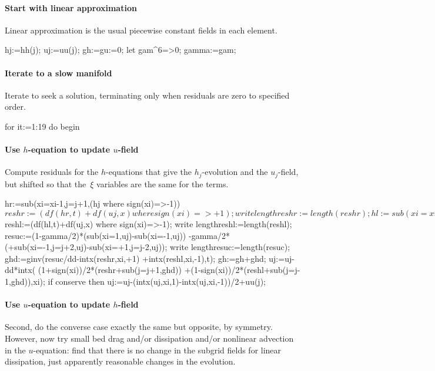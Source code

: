 \documentclass[10pt,a5paper]{article}
\begin{document}
\paragraph{Start with linear approximation}
Linear approximation is the usual piecewise constant fields in each element.
\begin{reduce}
hj:=hh(j); uj:=uu(j);
gh:=gu:=0;
let gam^6=>0;
gamma:=gam;
\end{reduce}

\paragraph{Iterate to a slow manifold}
Iterate to seek a solution, terminating only when residuals are zero to specified order.
\begin{reduce}
for it:=1:19 do begin
\end{reduce}

\paragraph{Use $h$-equation to update $u$-field}
Compute residuals for the $h$-equations that give the $h_j$-evolution and the $u_j$-field, but shifted so that the~$\xi$
variables are the same for the terms.  

\begin{reduce}
hr:=sub({xi=xi-1,j=j+1},(hj where sign(xi)=>-1))$
reshr:=(df(hr,t)+df(uj,x) where sign(xi)=>+1);
write lengthreshr:=length(reshr);
hl:=sub({xi=xi+1,j=j-1},(hj  where sign(xi)=>+1))$
reshl:=(df(hl,t)+df(uj,x) where sign(xi)=>-1);
write lengthreshl:=length(reshl);
resuc:=(1-gamma/2)*(sub(xi=1,uj)-sub(xi=-1,uj))
         -gamma/2*(+sub({xi=-1,j=j+2},uj)-sub({xi=+1,j=j-2},uj));
write lengthresuc:=length(resuc);
ghd:=ginv(resuc/dd-intx(reshr,xi,+1)
                  +intx(reshl,xi,-1),t);
gh:=gh+ghd;
uj:=uj-dd*intx( (1+sign(xi))/2*(reshr+sub(j=j+1,ghd))
               +(1-sign(xi))/2*(reshl+sub(j=j-1,ghd)),xi);
if conserve then uj:=uj-(intx(uj,xi,1)-intx(uj,xi,-1))/2+uu(j);
\end{reduce}

\paragraph{Use $u$-equation to update $h$-field}
Second, do the converse case exactly the same but opposite, by symmetry.  However, now try small bed drag and/or dissipation and/or nonlinear advection in the $u$-equation: find that there is no change in the subgrid fields for linear dissipation, just apparently reasonable changes in the evolution.  
\end{document}

